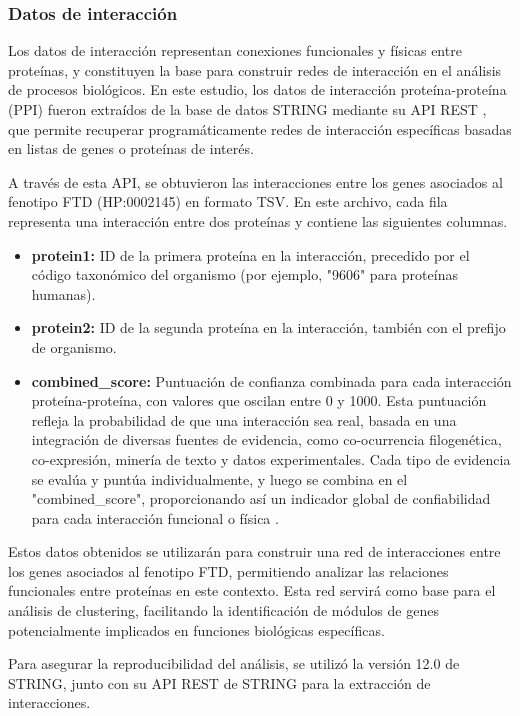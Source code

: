 \subsubsection*{Datos de interacción}

Los datos de interacción representan conexiones funcionales y físicas entre proteínas, y constituyen la base para construir redes de interacción en el análisis de procesos biológicos. En este estudio, los datos de interacción proteína-proteína (PPI) fueron extraídos de la base de datos STRING mediante su API REST \cite{string_api}, que permite recuperar programáticamente redes de interacción específicas basadas en listas de genes o proteínas de interés.

A través de esta API, se obtuvieron las interacciones entre los genes asociados al fenotipo FTD (HP:0002145) en formato TSV. En este archivo, cada fila representa una interacción entre dos proteínas y contiene las siguientes columnas.

\begin{itemize}
	\item \textbf{protein1:} ID de la primera proteína en la interacción, precedido por el código taxonómico del organismo (por ejemplo, "9606" para proteínas humanas).
	\item \textbf{protein2:} ID de la segunda proteína en la interacción, también con el prefijo de organismo.
	\item \textbf{combined\_score:} Puntuación de confianza combinada para cada interacción proteína-proteína, con valores que oscilan entre 0 y 1000. Esta puntuación refleja la probabilidad de que una interacción sea real, basada en una integración de diversas fuentes de evidencia, como co-ocurrencia filogenética, co-expresión, minería de texto y datos experimentales. Cada tipo de evidencia se evalúa y puntúa individualmente, y luego se combina en el "combined\_score", proporcionando así un indicador global de confiabilidad para cada interacción funcional o física \cite{szklarczyk2023stringdb}.
\end{itemize}

Estos datos obtenidos se utilizarán para construir una red de interacciones entre los genes asociados al fenotipo FTD, permitiendo analizar las relaciones funcionales entre proteínas en este contexto. Esta red servirá como base para el análisis de clustering, facilitando la identificación de módulos de genes potencialmente implicados en funciones biológicas específicas.

Para asegurar la reproducibilidad del análisis, se utilizó la versión 12.0 de STRING, junto con su API REST de STRING para la extracción de interacciones.


